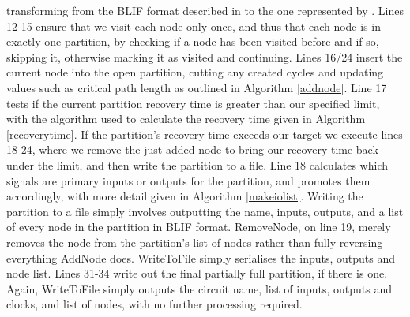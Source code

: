 \documentclass[12pt,final,oneside]{dwThesis} %
\begin{document}
   transforming from the \gls{BLIF} format described in  to the one represented by .  Lines
   12-15 ensure that we visit each node only once, and thus that each node is
   in exactly one partition, by checking if a node has been visited before and
   if so, skipping it, otherwise marking it as visited and continuing.  Lines
   16/24 insert the current node into the open partition, cutting any created
   cycles and updating values such as critical path length as outlined in
   Algorithm \ref{addnode}.  Line 17 tests if the current partition recovery
   time is greater than our specified limit, with the algorithm used to
   calculate the recovery time given in Algorithm \ref{recoverytime}.  If the
   partition's recovery time exceeds our target we execute lines 18-24, where
   we remove the just added node to bring our recovery time back under the
   limit, and then write the partition to a file.  Line 18 calculates which
   signals are primary inputs or outputs for the partition, and promotes them
   accordingly, with more detail given in Algorithm \ref{makeiolist}.  Writing
   the partition to a file simply involves outputting the name, inputs,
   outputs, and a list of every node in the partition in \gls{BLIF} format.
   RemoveNode, on line 19, merely removes the node from the partition's list of
   nodes rather than fully reversing everything AddNode does. WriteToFile
   simply serialises the inputs, outputs and node list.  Lines 31-34 write out
   the final partially full partition, if there is one. Again, WriteToFile
   simply outputs the circuit name, list of inputs, outputs and clocks, and
   list of nodes, with no further processing required.
\end{document}
